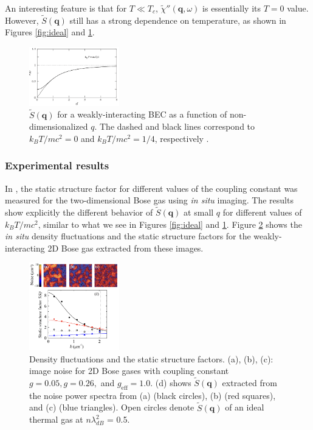\documentclass[prl,
twocolumn,
nofootinbib,
amsmath,amssymb,
aps]{revtex4-1}
\begin{document}
An interesting feature is that for $T \ll T_c$, $\widetilde{\chi}''(\mathbf{q},\omega)$ is essentially its $T=0$ value. However, $\widetilde{S}(\mathbf{q})$ still has a strong dependence on temperature, as shown in Figures \ref{fig:ideal} and \ref{fig:interacting}. 

\begin{figure}[!htb]
\centering
\includegraphics[width=0.35\textwidth]{figures/interacting.png}
\caption{\label{fig:interacting} $\widetilde{S}(\mathbf{q})$ for a weakly-interacting BEC as a function of non-dimensionalized $q$. The dashed and black lines correspond to $k_BT/mc^2=0$ and $k_BT/mc^2 = 1/4$, respectively \cite{pitaevskii2016bose}.}
\end{figure}
\subsubsection{Experimental results}

In \cite{hung2011extracting}, the static structure factor for different values of the coupling constant was measured for the two-dimensional Bose gas using \textit{in situ} imaging. The results show explicitly the different behavior of $\widetilde{S}(\mathbf{q})$ at small $q$ for different values of $k_BT / mc^2$, similar to what we see in Figures \ref{fig:ideal} and \ref{fig:interacting}. Figure \ref{fig:hung2011} shows the \textit{in situ} density fluctuations and the static structure factors for the weakly-interacting 2D Bose gas extracted from these images. 
\begin{figure}[!htb]
\centering
\includegraphics[width=0.35\textwidth]{figures/hung2011.png}
\caption{\label{fig:hung2011}
 Density fluctuations and the static structure factors. (a), (b), (c): image noise for 2D Bose gases with coupling constant $g = 0.05, g = 0.26,$ and $g_\text{eff} = 1.0$. (d) shows $\widetilde{S}(\mathbf{q})$ extracted from the noise power spectra from (a) (black circles), (b) (red squares), and (c) (blue triangles). Open circles denote $\widetilde{S}(\mathbf{q})$ of an ideal thermal gas at $n\lambda_{dB}^2$ = 0.5. }
\end{figure}
\end{document}
